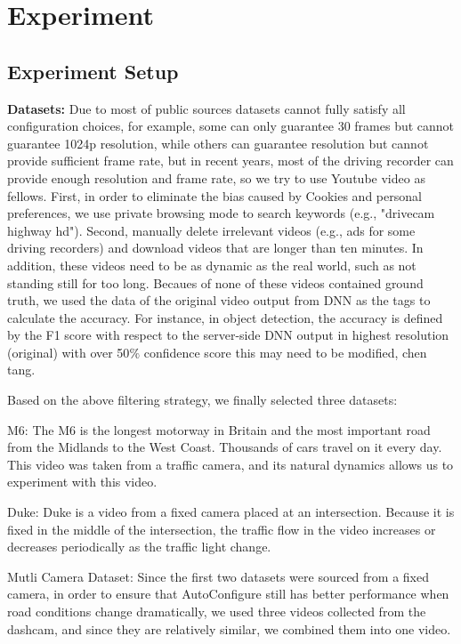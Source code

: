 \section{Experiment}
\label{Section: experiment}

\subsection{Experiment Setup}
\textbf{Datasets:} Due to most of public sources datasets cannot fully satisfy all configuration choices, for example, some can only guarantee 30 frames but cannot guarantee 1024p resolution, while others can guarantee resolution but cannot provide sufficient frame rate, but in recent years, most of the driving recorder can provide enough resolution and frame rate, so we try to use Youtube video as fellows. First, in order to eliminate the bias caused by Cookies and personal preferences, we use private browsing mode to search keywords (e.g., "drivecam highway hd"). Second, manually delete irrelevant videos (e.g., ads for some driving recorders) and download videos that are longer than ten minutes. In addition, these videos need to be as dynamic as the real world, such as not standing still for too long. Becaues of none of these videos contained ground truth, we used the data of the original video output from DNN as the tags to calculate the accuracy. For instance, in object detection, the accuracy is defined by the F1 score with respect to the server-side DNN output in highest resolution (original) with over 50$\%$ confidence score \textcolor{note}{this may need to be modified, chen tang}.

Based on the above filtering strategy, we finally selected three datasets: 

M6: The M6 is the longest motorway in Britain and the most important road from the Midlands to the West Coast. Thousands of cars travel on it every day. This video was taken from a traffic camera, and its natural dynamics allows us to experiment with this video.

Duke: Duke is a video from a fixed camera placed at an intersection. Because it is fixed in the middle of the intersection, the traffic flow in the video increases or decreases periodically as the traffic light change.

Mutli Camera Dataset: Since the first two datasets were sourced from a fixed camera, in order to ensure that AutoConfigure still has better performance when road conditions change dramatically, we used three videos collected from the dashcam, and since they are relatively similar, we combined them into one video.
